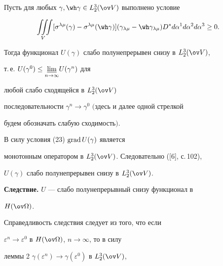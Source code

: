 \begin{thm} 


Пусть для любых $\gamma,\wh\gamma\in L^3_2(\ov V)$ выполнено условие 


\begin{equation} 


\iiint\limits_V[\sigma^{\lambda\mu}(\gamma)- 


\sigma^{\lambda\mu}(\wh \gamma)](\gamma_{\lambda\mu}- 


\wh \gamma_{\lambda\mu})D^* 


d\alpha^1d\alpha^2d\alpha^3\ge0.


\end{equation} 


Тогда функционал $U(\gamma)$ слабо полунепрерывен снизу в $L^3_2(\ov V)$, 


т.\,е. $U(\gamma^0)\le\underset{n\to\infty}{\varliminf}{} U(\gamma^n)$ для 


любой слабо сходящейся в $L^3_2(\ov V)$ 


последовательности $\gamma^n\to\gamma^0$ $($здесь и далее одной стрелкой 


будем обозначать слабую сходимость$)$. 


\end{thm} 


 


\begin{pf} 


В силу условия (23) $\operatorname{grad} U(\gamma)$ является 


монотонным оператором в $L^3_2(\ov V)$. Следовательно ([6], с.\,102), 


$U(\gamma)$ слабо полунепрерывен снизу в $L^3_2(\ov V)$. 


\end{pf} 


 


{\bf Следствие.} $U$ --- слабо полунепрерывный снизу функционал в 


$H(\ov\Omega)$. 


\medskip 


 


Справедливость следствия следует из того, что если 


$\varepsilon^n\to\varepsilon^0$ в $H(\ov\Omega)$, $n\to\infty$, то в силу 


леммы 2 $\gamma(\varepsilon^n)\to\gamma(\varepsilon^0)$ в $L^3_2(\ov V)$, 


